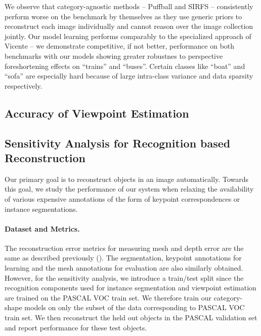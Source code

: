 We observe that category-agnostic methods -- Puffball\cite{twarog2012playing} and SIRFS\cite{barronPAMI13, Barron2012B} -- consistently perform worse on the benchmark by themselves as they use generic priors to reconstruct each image individually and cannot reason over the image collection jointly. Our model learning performs comparably to the specialized approach of Vicente \etal -- we demonstrate competitive, if not better, performance on both benchmarks with our models showing greater robustnes to perspective foreshortening effects on ``trains'' and ``buses''.  Certain classes like ``boat'' and ``sofa'' are especially hard because of large intra-class variance and data sparsity respectively.

\subsection{Accuracy of Viewpoint Estimation}


\subsection{Sensitivity Analysis for Recognition based Reconstruction} 



Our primary goal is to reconstruct objects in an image automatically. Towards this goal, we study the performance of our system when relaxing the availability of various  expensive annotations of the form of keypoint correspondences or instance segmentations. 


\paragraph{Dataset and Metrics.}
The reconstruction error metrics for measuring mesh and depth error are the same as described previously (). The segmentation, keypoint annotations for learning and the mesh annotations for evaluation are also similarly obtained. However, for the sensitivity analysis, we introduce a train/test split since the recognition components used for instance segmentation and viewpoint estimation are trained on the PASCAL VOC train set. We therefore train our category-shape models  on only the subset of the data corresponding to PASCAL VOC train set. We then reconstruct the held out objects in the PASCAL validation set and report performance for these test objects.


